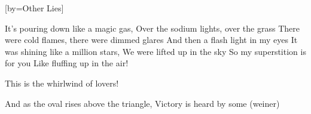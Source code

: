 [by={Other Lies}]

  \chordsoff

  
  \beginverse
  \endverse

  \beginchorus
  \endchorus

  \beginverse
  It’s pouring down like a magic gas,
  Over the sodium lights, over the grass
  There were cold flames, there were dimmed glares
  And then a flash light in my eyes
  It was shining like a million stars,
  We were lifted up in the sky
  So my superstition is for you
  Like fluffing up in the air!
  \endverse

  \beginchorus
  This is the whirlwind of lovers!
  \endchorus


  \beginchorus
  And as the oval rises above the triangle,
  Victory is heard by some (weiner)
  \endchorus
  
\endsong
